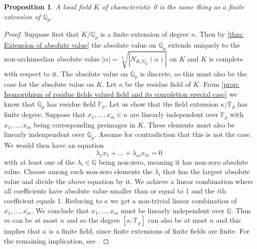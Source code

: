 \documentclass{article}
\newtheorem{proposition}{Proposition}[section]
\newcommand{\mfrak}[1]{\mathfrak{#1}}
\newcommand{\mbb}[1]{\mathbb{#1}}
\numberwithin{equation}{section}
\begin{document}
\begin{proposition}\label{prop: Characterization of local fields}
    A local field $K$ of characteristic 0 is the same thing as a finite extension of $\mbb Q_p$.
\end{proposition}
\begin{proof}
    Suppose first that $K /\mbb Q_p$ is a finite extension of degree $n$. Then by \cref{thm: Extension of absolute value} the absolute value on $\mbb Q_p$ extends uniquely to the non-archimedian absolute value $|\alpha| = \sqrt[n]{|N_{K/\mbb Q_p}(\alpha)|}$ on $K$ and $K$ is complete with respect to it. The absolute value on $\mbb Q_p$ is discrete, so this must also be the case for the absolute value on $K$. Let $\kappa$ be the residue field of $K$. From \cref{prop: Isomorphism of residue fields valued field and its completion special case} we know that $\mbb Q_p$ has residue field $\mbb F_p$. Let us show that the field extension $\kappa / \mbb F_p$ has finite degree. Suppose that $\overline {x_1}, ..., \overline{x_m} \in \kappa$ are linearly independent over $\mbb F_p$ with $x_1, ..., x_m$ being corresponding preimages in $K$. These elements must also be linearly indenpendent over $\mbb Q_p$. Assume for contradiction that this is not the case. We would then have an equation
    $$\lambda_1 x_1 + ... + \lambda_m x_m = 0$$
    with at least one of the $\lambda_i \in \mbb Q$ being non-zero, meaning it has non-zero absolute value. Choose among such non-zero elements the $\lambda_i$ that has the largest absolute value and divide the above equation by it. We achieve a linear combination where all coefficients have absolute value smaller than or equal to 1 and the $i$th coefficient equals 1. Reducing to $\kappa$ we get a non-trivial linear combination of $\overline{x_1}, ..., \overline{x_m}$. We conclude that $x_1, ..., x_m$ must be linearly independent over $\mbb Q$. Thus $m$ can be at most $n$ and so the degree $[\kappa : \mbb F_p]$ can also be at most $n$ and this implies that $\kappa$ is a finite field, since finite extensions of finite fields are finite. For the remaining implication, see \citep[Proposition 5.2]{neukirch}. 



\end{proof}
\end{document}
